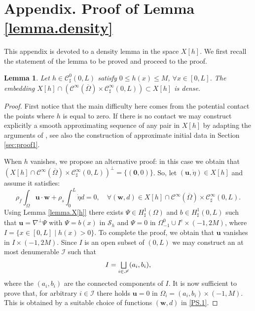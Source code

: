 \documentclass[10pt]{amsart}
\let\mathcal\mathscr
\let\oldbigsqcup\bigsqcup
\renewcommand{\bigsqcup}{\mathop{\textstyle\oldbigsqcup}\displaylimits}
\newtheorem{lemma}[theorem]{Lemma}
\theoremstyle{remark}
\theoremstyle{definition}
\newcommand{\ug}{\boldsymbol{u}}
\newcommand{\wg}{\boldsymbol{w}}
\newcommand{\BS}[1]{\boldsymbol{#1}}
\let\CM\Omega
\newcommand{\etap}{\dot{\eta}}
\begin{document}
\appendix
\section*{Appendix. Proof of Lemma \ref{lemma.density}}
\label{Annexe}
This appendix is devoted to a density lemma in the space $X[h]$.
We first recall the statement of the lemma to be proved and proceed
to the proof.

\begin{lemma}\label{lemma.density.app}
Let $h \in \mathcal C^0_{\sharp}(0,L)$ satisfy $0 \leq h(x) \leq M$, $\forall x\in [0, L]$. The embedding $X[h]\cap (\mathcal{C}^{\infty}(\overline{\CM}) \times \mathcal C^{\infty}_{\sharp}(0,L)) \subset X[h]$ is dense.
\end{lemma}

\begin{proof}
First notice that the main difficulty here comes from the potential contact \ie the points where $h$ is equal to zero. If there is no contact we may construct explicitly a smooth approximating sequence of any pair in $X[h]$ by adapting the arguments of \cite{Chambolle-etal}, see also the construction of approximate initial data in Section \ref{sec:proof1}.

When $h$ vanishes, we propose an alternative proof: in this case we obtain that $(X[h]\cap \mathcal{C}^{\infty}(\overline{\CM}) \times \mathcal C^{\infty}_{\sharp}(0,L))^{\perp}=\{(\BS{0},0)\}$. So, let $(\ug,\etap) \in X[h]$ and assume it satisfies:%
\begin{equation}\label{PS.1}\rho_{f}\int_{\CM}\ug\cdot\wg +\rho_{s}\int_{0}^{L}\etap d=0, \quad
\forall (\wg,d)\in X[h]\cap \mathcal{C}^{\infty}(\overline{\CM}) \times \mathcal C^{\infty}_{\sharp}(0,L).
\end{equation}
Using Lemma \ref{lemma.X[h]} there exists $\Psi\in H^{1}_{\sharp}(\CM)$ and $b\in H^{1}_{\sharp}(0,L)$ such that $\ug=\nabla^{\bot}\Psi$ with $\Psi=b(x)$ in $\mathcal{S}_{h}$ and $\Psi=0$ in $\Omega^{0}_{-1} \cup I^{c}\times(-1,2M)$, where $I=\{x\in[0,L]\mid h(x)>0\}$. To complete the proof, we obtain that $\ug$ vanishes in $I\times(-1,2M)$.
Since $I$ is an open subset of $(0,L)$ we may construct an at most denumerable $\mathcal I$ such that
\[
I=\bigsqcup_{i\in\mathcal I}(a_{i},b_{i}),
\]
where the $(a_{i},b_{i})$ are the connected components of $I$. It is now sufficient to prove that, for arbitrary $i\in \mathcal I$ there holds $\ug=0$ in $\CM_{i}=(a_{i},b_{i})\times(-1,M)$. This is obtained by a suitable choice of functions $(\wg,d)$ in \eqref{PS.1}.


\end{proof}
\end{document}
